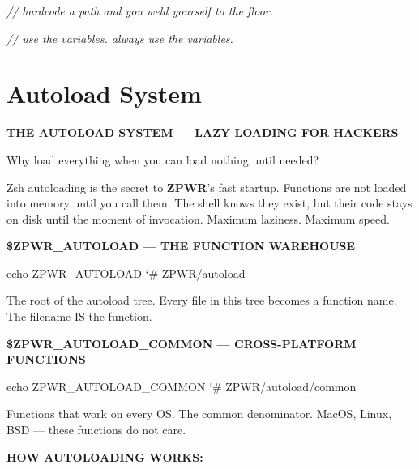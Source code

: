 \documentclass[11pt,a4paper,twoside]{book}
\begin{document}
{\small\itshape\color{dimtext} // hardcode a path and you weld yourself to the floor.}

{\small\itshape\color{dimtext} // use the variables. always use the variables.}


\vspace{16pt}

\section{Autoload System}


\vspace{10pt}
{\large\bfseries\color{neoncyan} THE AUTOLOAD SYSTEM — LAZY LOADING FOR HACKERS}\vspace{6pt}

Why load everything when you can load nothing until needed?

Zsh autoloading is the secret to \textbf{ZPWR}'s fast startup. Functions are not loaded into memory until you call them. The shell knows they exist, but their code stays on disk until the moment of invocation. Maximum laziness. Maximum speed.


\vspace{12pt}
{\bfseries\color{neonyellow} \$\textbf{ZPWR\_AUTOLOAD} — THE FUNCTION WAREHOUSE}\vspace{4pt}

\begin{codebox}
\color{neongreen}echo ZPWR\_AUTOLOAD   {\char`\#} ZPWR/autoload\\
\end{codebox}

The root of the autoload tree. Every file in this tree becomes a function name. The filename IS the function.


\vspace{12pt}
{\bfseries\color{neonyellow} \$\textbf{ZPWR\_AUTOLOAD}\_COMMON — CROSS-PLATFORM FUNCTIONS}\vspace{4pt}

\begin{codebox}
\color{neongreen}echo ZPWR\_AUTOLOAD\_COMMON   {\char`\#} ZPWR/autoload/common\\
\end{codebox}

Functions that work on every OS. The common denominator. MacOS, Linux, BSD — these functions do not care.


\vspace{12pt}
{\bfseries\color{neonyellow} HOW AUTOLOADING WORKS:}\vspace{4pt}
\end{document}

